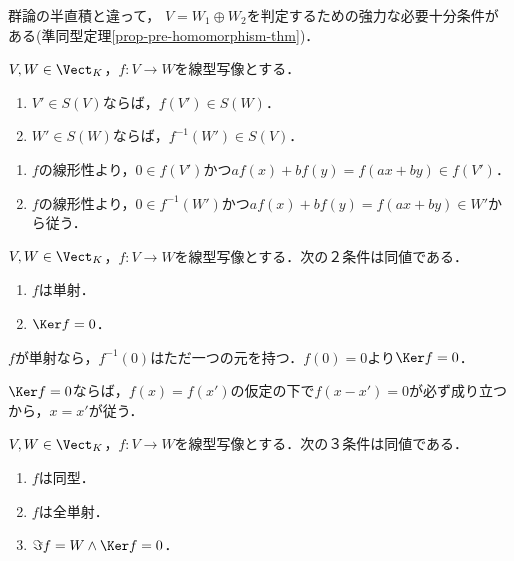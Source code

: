 \documentclass[uplatex, dvipdfmx]{jsreport}
\begin{document}
\begin{tcolorbox}[colframe=ForestGreen, colback=ForestGreen!10!white,breakable,colbacktitle=ForestGreen!40!white,coltitle=black,fonttitle=\bfseries\sffamily,
title=]
    群論の半直積と違って，
    $V=W_1\oplus W_2$を判定するための強力な必要十分条件がある(準同型定理\ref{prop-pre-homomorphism-thm})．
\end{tcolorbox}

\begin{proposition}
    $V,W\in\Vect_K$，$f:V\to W$を線型写像とする．
    \begin{enumerate}
        \item $V'\in S(V)$ならば，$f(V')\in S(W)$．
        \item $W'\in S(W)$ならば，$f^{-1}(W')\in S(V)$．
    \end{enumerate}
\end{proposition}
\begin{Proof}\mbox{}
    \begin{enumerate}
        \item $f$の線形性より，$0\in f(V')$かつ$af(x)+bf(y)=f(ax+by)\in f(V')$．
        \item $f$の線形性より，$0\in f^{-1}(W')$かつ$af(x)+bf(y)=f(ax+by)\in W'$から従う．
    \end{enumerate}
\end{Proof}

\begin{proposition}[単射の特徴付け]\label{prop-characterization-of-monos-in-terms-of-Kernel}
    $V,W\in\Vect_K$，$f:V\to W$を線型写像とする．次の２条件は同値である．
    \begin{enumerate}
        \item $f$は単射．
        \item $\Ker f=0$．
    \end{enumerate}
\end{proposition}
\begin{Proof}
    $f$が単射なら，$f^{-1}(0)$はただ一つの元を持つ．$f(0)=0$より$\Ker f=0$．

    $\Ker f=0$ならば，$f(x)=f(x')$の仮定の下で$f(x-x')=0$が必ず成り立つから，$x=x'$が従う．
\end{Proof}

\begin{corollary}[可逆性と全単射は同値]\label{cor-invertible-if-全単射}
    $V,W\in\Vect_K$，$f:V\to W$を線型写像とする．次の３条件は同値である．
    \begin{enumerate}
        \item $f$は同型．
        \item $f$は全単射．
        \item $\Im f=W\land\Ker f=0$．
    \end{enumerate}
\end{corollary}
\end{document}
